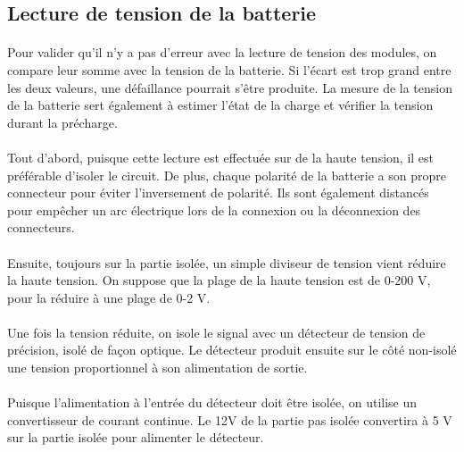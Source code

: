 
\subsection{Lecture de tension de la batterie}
	\paragraph*{}
	Pour valider qu'il n'y a pas d'erreur avec la lecture de tension des modules, on compare leur somme avec la tension de la batterie. Si l'écart est trop grand entre les deux valeurs, une défaillance pourrait s'être produite. La mesure de la tension de la batterie sert également à estimer l'état de la charge et vérifier la tension durant la précharge. 
	
	\paragraph*{}
	Tout d'abord, puisque cette lecture est effectuée sur de la haute tension, il est préférable d'isoler le circuit. De plus, chaque polarité de la batterie a son propre connecteur pour éviter l'inversement de polarité. Ils sont également distancés pour empêcher un arc électrique lors de la connexion ou la déconnexion des connecteurs.
	
	\paragraph*{}
	Ensuite, toujours sur la partie isolée, un simple diviseur de tension vient réduire la haute tension. On suppose que la plage de la haute tension est de 0-200 V, pour la réduire à une plage de 0-2 V.
	
	\paragraph*{}
	Une fois la tension réduite, on isole le signal avec un détecteur de tension de précision, isolé de façon optique. Le détecteur produit ensuite sur le côté non-isolé une tension proportionnel à son alimentation de sortie.
	
	\paragraph*{}	
	Puisque l'alimentation à l'entrée du détecteur doit être isolée, on utilise un convertisseur de courant continue. Le 12V de la partie pas isolée convertira à 5 V sur la partie isolée pour alimenter le détecteur.
	
